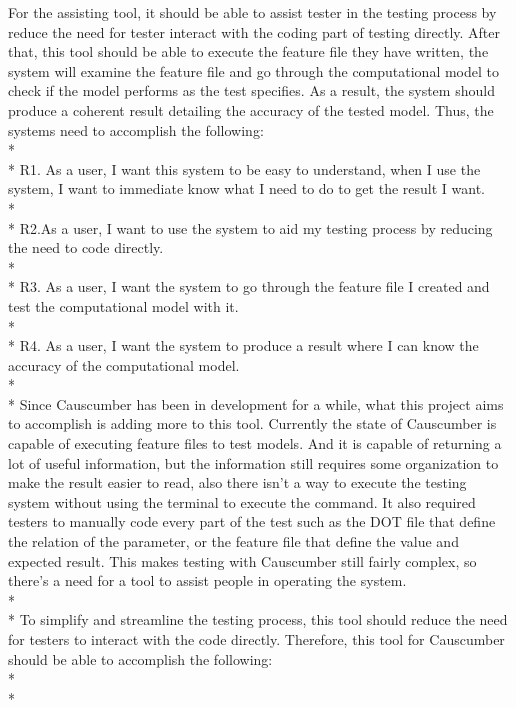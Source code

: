 For the assisting tool, it should be able to assist tester in the testing process by reduce the need for tester interact with the coding part of testing directly. After that, this tool should be able to execute the feature file they have written, the system will examine the feature file and go through the computational model to check if the model performs as the test specifies. As a result, the system should produce a coherent result detailing the accuracy of the tested model. Thus, the systems need to accomplish the following:\\*
\\*
R1. As a user, I want this system to be easy to understand, when I use the system, I want to immediate know what I need to do to get the result I want.\\*
\\*
R2.As a user, I want to use the system to aid my testing process by reducing the need to code directly. \\*
\\*
R3. As a user, I want the system to go through the feature file I created and test the computational model with it.\\*
\\*
R4. As a user, I want the system to produce a result where I can know the accuracy of the computational model.\\*
\\*
Since Causcumber has been in development for a while, what this project aims to accomplish is adding more to this tool. Currently the state of Causcumber is capable of executing feature files to test models. And it is capable of returning a lot of useful information, but the information still requires some organization to make the result easier to read, also there isn’t a way to execute the testing system without using the terminal to execute the command. It also required testers to manually code every part of the test such as the DOT file that define the relation of the parameter, or the feature file that define the value and expected result. This makes testing with Causcumber still fairly complex, so there’s a need for a tool to assist people in operating the system. \\*\\*
To simplify and streamline the testing process, this tool should reduce the need for testers to interact with the code directly. Therefore, this tool for Causcumber should be able to accomplish the following:\\*
\\*
